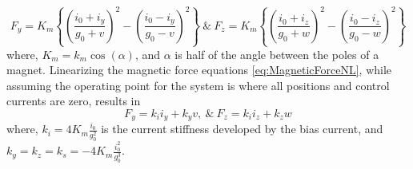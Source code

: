\begin{equation}\label{eq:MagneticForceNL}
F_y=K_m\left\{\left(\frac{i_0+i_y}{g_0+v}\right)^2-\left(\frac{i_0-i_y}{g_0-v}\right)^2\right\}\ \&\ F_z=K_m\left\{\left(\frac{i_0+i_z}{g_0+w}\right)^2-\left(\frac{i_0-i_z}{g_0-w}\right)^2\right\}
\end{equation}
where, $ K_m=k_m\cos(\alpha) $, and $ \alpha $ is half of the angle between the poles of a magnet. Linearizing the magnetic force equations \eqref{eq:MagneticForceNL}, while assuming the operating point for the system is where all positions and control currents are zero, results in
\begin{equation}\label{eq:MagneticForce}
F_y=k_ii_y+k_yv,\ \&\ F_z=k_ii_z+k_zw
\end{equation}
where, $ k_i=4K_m\frac{i_0}{g_0^2} $ is the current stiffness developed by the bias current, and $ k_y=k_z=k_s=-4K_m\frac{i_0^2}{g_0^3} $.
